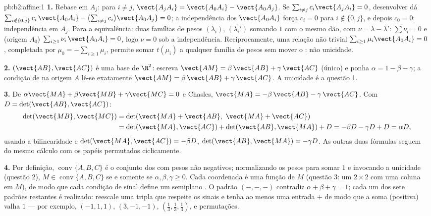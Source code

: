 \begin{solution}{pb:b2:affine:1}
\textbf{1.} Rebase em $A_j$: para $i \neq j$, $\vect{A_jA_i} =
\vect{A_0A_i} - \vect{A_0A_j}$. Se $\sum_{i \neq j}
c_i\vect{A_jA_i} = 0$, desenvolver dá $\sum_{i \notin \{0,
j\}} c_i\,\vect{A_0A_i} - \bigl(\sum_{i\neq j}
c_i\bigr)\vect{A_0A_j} = 0$; a independência dos
$\vect{A_0A_i}$ força $c_i = 0$ para $i \notin \{0, j\}$, e depois
$c_0 = 0$: independência em $A_j$. Para a equivalência: duas
famílias de pesos $(\lambda_i)$, $(\lambda_i')$ somando $1$
com o mesmo  dão, com $\nu = \lambda -
\lambda'$: $\sum\nu_i = 0$ e (origem $A_0$) $\sum_{i \geq
1}\nu_i\,\vect{A_0A_i} = 0$, logo $\nu = 0$ sob a independência.
Reciprocamente, uma relação não trivial $\sum_{i\geq1}\mu_i
\vect{A_0A_i} = 0$, completada por $\mu_0 = -\sum_{i\geq1}
\mu_i$, permite somar $t(\mu_i)$ a qualquer família de pesos sem
mover o : não unicidade.

\textbf{2.} $(\vect{AB}, \vect{AC})$ é uma base de $\R^2$:
escreva $\vect{AM} = \beta\,\vect{AB} + \gamma\,\vect{AC}$
(único) e ponha $\alpha = 1 - \beta - \gamma$; a condição de 
na origem $A$ lê-se exatamente $\vect{AM} =
\beta\,\vect{AB} + \gamma\,\vect{AC}$. A unicidade é a questão
1.

\textbf{3.} De $\alpha\vect{MA} + \beta\vect{MB} +
\gamma\vect{MC} = 0$ e Chasles, $\vect{MA} =
-\beta\,\vect{AB} - \gamma\,\vect{AC}$. Com $D =
\det(\vect{AB}, \vect{AC})$:
\begin{align*}
\det(\vect{MB}, \vect{MC})
&= \det(\vect{MA} + \vect{AB},\ \vect{MA} + \vect{AC})\\
&= \det(\vect{MA}, \vect{AC}) + \det(\vect{AB}, \vect{MA}) +
D = -\beta D - \gamma D + D = \alpha D,
\end{align*}
usando a bilinearidade e $\det(\vect{MA}, \vect{AC}) = -\beta D$,
$\det(\vect{AB}, \vect{MA}) = -\gamma D$. As outras duas
fórmulas seguem do mesmo cálculo com os papéis
permutados ciclicamente.

\textbf{4.} Por definição, $\operatorname{conv}\{A, B, C\}$ é
o conjunto dos  com pesos não negativos; normalizando
os pesos para somar $1$ e invocando a unicidade (questão 2),
$M \in \operatorname{conv}\{A,B,C\}$ se e somente se $\alpha, \beta,
\gamma \geq 0$. Cada coordenada é uma função  de $M$
(questão 3: um  $2\times2$ com uma coluna 
em $M$), de modo que cada condição  de sinal define um semiplano
. O padrão $(-,-,-)$ contradiz $\alpha + \beta
+ \gamma = 1$; cada um dos sete padrões restantes é
realizado: reescale uma tripla que respeite os sinais e tenha ao menos uma
entrada $+$ de modo que a soma (positiva) valha $1$ --- por exemplo,
$(-1, 1, 1)$, $(3, -1, -1)$, $(\frac13, \frac13, \frac13)$,
e permutações.


\end{solution}
